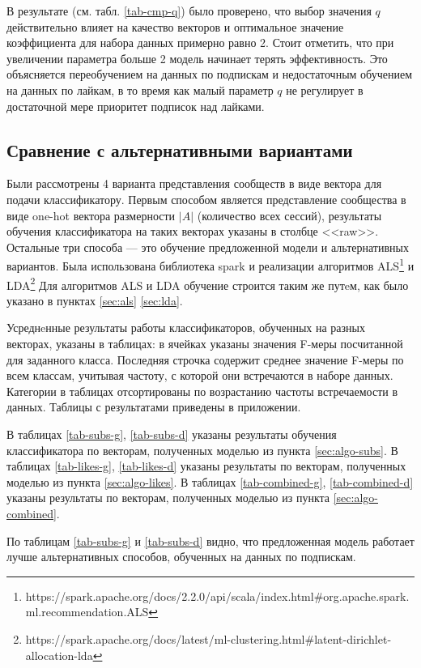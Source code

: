 \documentclass[times,specification,annotation]{itmo-student-thesis}
\begin{document}
В результате (см. табл. \ref {tab-cmp-q}) было проверено, что выбор значения $q$ действительно влияет на качество векторов и оптимальное значение коэффициента для набора данных примерно равно 2. Стоит отметить, что при увеличении параметра больше 2 модель начинает терять эффективность. Это объясняется переобучением на данных по подпискам и недостаточным обучением на данных по лайкам, в то время как малый параметр $q$ не регулирует в достаточной мере приоритет подписок над лайками.  

\subsection{Сравнение с альтернативными вариантами}\label{class-alter}

Были рассмотрены 4 варианта представления сообществ в виде вектора для подачи классификатору. Первым способом является представление сообщества в виде one-hot вектора размерности $|A|$ (количество всех сессий), результаты обучения классификатора на таких векторах указаны в столбце <<raw>>. Остальные три способа --- это обучение предложенной модели и альтернативных вариантов. Была использована библиотека spark и реализации алгоритмов ALS\footnote{https://spark.apache.org/docs/2.2.0/api/scala/index.html\#org.apache.spark.ml.recommendation.ALS} и LDA\footnote{https://spark.apache.org/docs/latest/ml-clustering.html\#latent-dirichlet-allocation-lda} Для алгоритмов ALS и LDA обучение строится таким же путeм, как было указано в пунктах \ref{sec:als} \ref{sec:lda}.  

Усреднeнные результаты работы классификаторов, обученных на разных векторах, указаны в таблицах: в ячейках указаны значения F-меры посчитанной для заданного класса. Последняя строчка содержит среднее значение F-меры по всем классам, учитывая частоту, с которой они встречаются в наборе данных. Категории в таблицах отсортированы по возрастанию частоты встречаемости в данных. Таблицы с результатами приведены в приложении.

В таблицах \ref{tab-subs-g}, \ref{tab-subs-d} указаны результаты обучения классификатора по векторам, полученных моделью из пункта \ref{sec:algo-subs}. В таблицах \ref{tab-likes-g}, \ref{tab-likes-d} указаны результаты по векторам, полученных моделью из пункта \ref{sec:algo-likes}. В таблицах \ref{tab-combined-g}, \ref{tab-combined-d} указаны результаты по векторам, полученных моделью из пункта \ref{sec:algo-combined}. 

По таблицам \ref{tab-subs-g} и \ref{tab-subs-d} видно, что предложенная модель работает лучше альтернативных способов, обученных на данных по подпискам.  
\end{document}
